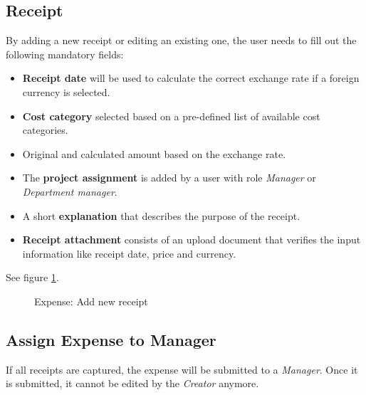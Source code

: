\subsection{Receipt}
\label{sec:addreceipt}
By adding a new receipt or editing an existing one, the user needs to fill out the following mandatory fields:
\begin{itemize}
    \item \textbf{Receipt date} will be used to calculate the correct exchange rate if a foreign currency is selected.
    \item \textbf{Cost category} selected based on a pre-defined list of available cost categories.
    \item Original and calculated amount based on the exchange rate.
    \item The \textbf{project assignment} is added by a user with role \textit{Manager} or \textit{Department manager}.
    \item A short \textbf{explanation} that describes the purpose of the receipt.
    \item \textbf{Receipt attachment} consists of an upload document that verifies the input information like receipt date, price and currency.
\end{itemize}

See figure \ref{fig:expenses-add01}.


\begin{figure}[H]
    \centering
    \caption{Expense: Add new receipt}
    \label{fig:expenses-add01}
\end{figure}

\subsection{Assign Expense to Manager}
If all receipts are captured, the expense will be submitted to a \textit{Manager}. Once it is submitted, it cannot be edited by the \textit{Creator} anymore.


